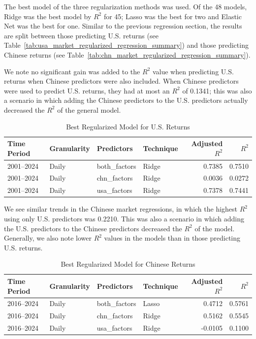 The best model of the three regularization methods was used. Of the 48 models, Ridge was the best model by $R^2$ for 45; Lasso was the best for two and Elastic Net was the best for one. Similar to the previous regression section, the results are split between those predicting U.S. returns (see Table~\ref{tab:usa_market_regularized_regression_summary}) and those predicting Chinese returns (see Table~\ref{tab:chn_market_regularized_regression_summary}).

We note no significant gain was added to the $R^2$ value when predicting U.S. returns when Chinese predictors were also included. When Chinese predictors were used to predict U.S. returns, they had at most an $R^2$ of 0.1341; this was also a scenario in which adding the Chinese predictors to the U.S. predictors actually decreased the $R^2$ of the general model.

\begin{table}[htbp]
\centering
\caption{Best Regularized Model for U.S. Returns}
\label{tab:table2}
\begin{tabular}{@{}llllrr@{}}
\toprule
Time Period & Granularity & Predictors     & Technique & Adjusted $R^2$ & $R^2$ \\ \midrule
2001--2024  & Daily       & both\_factors  & Ridge          & 0.7385         & 0.7510 \\
2001--2024  & Daily       & chn\_factors   & Ridge          & 0.0036         & 0.0272 \\
2001--2024  & Daily       & usa\_factors   & Ridge          & 0.7378         & 0.7441 \\ \bottomrule
\end{tabular}
\end{table}

We see similar trends in the Chinese market regressions, in which the highest $R^2$ using only U.S. predictors was 0.2210. This was also a scenario in which adding the U.S. predictors to the Chinese predictors decreased the $R^2$ of the model. Generally, we also note lower $R^2$ values in the models than in those predicting U.S. returns.

\begin{table}[htbp]
\centering
\caption{Best Regularized Model for Chinese Returns}
\label{tab:table3}
\begin{tabular}{@{}llllrr@{}}
\toprule
Time Period & Granularity & Predictors     & Technique & Adjusted $R^2$ & $R^2$ \\ \midrule
2016--2024  & Daily       & both\_factors  & Lasso          & 0.4712         & 0.5761 \\
2016--2024  & Daily       & chn\_factors   & Ridge          & 0.5162         & 0.5545 \\
2016--2024  & Daily       & usa\_factors   & Ridge          & -0.0105        & 0.1100 \\ \bottomrule
\end{tabular}
\end{table}

